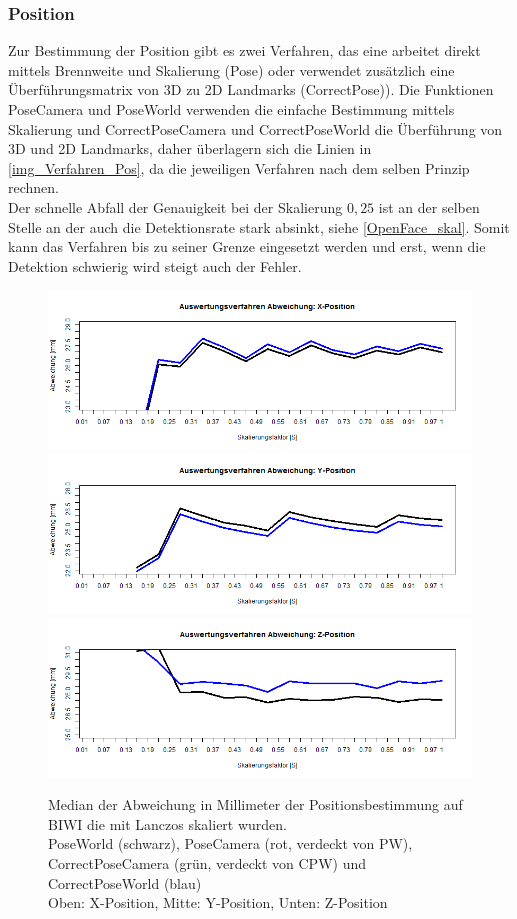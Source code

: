 \subsubsection{Position}
Zur Bestimmung der Position gibt es zwei Verfahren, das eine arbeitet direkt mittels Brennweite und Skalierung (Pose) oder verwendet zusätzlich eine Überführungsmatrix von 3D zu 2D Landmarks (CorrectPose)).
\newpage
Die Funktionen PoseCamera und PoseWorld verwenden die einfache Bestimmung mittels Skalierung und CorrectPoseCamera und CorrectPoseWorld die Überführung von 3D und 2D Landmarks, daher überlagern sich die Linien in \autoref{img_Verfahren_Pos}, da die jeweiligen Verfahren nach dem selben Prinzip rechnen.\\
Der schnelle Abfall der Genauigkeit bei der Skalierung $0,25$ ist an der selben Stelle an der auch die Detektionsrate stark absinkt, siehe \autoref{OpenFace_skal}. Somit kann das Verfahren bis zu seiner Grenze eingesetzt werden und erst, wenn die Detektion schwierig wird steigt auch der Fehler.
\begin{figure}
	\centering
	\includegraphics[width=\linewidth]{img_Skalierung/Verfahren_TX}
	\includegraphics[width=\linewidth]{img_Skalierung/Verfahren_TY}
	\includegraphics[width=\linewidth]{img_Skalierung/Verfahren_TZ}
	\caption{Median der Abweichung in Millimeter der Positionsbestimmung auf BIWI \cite{database_Face_Ori} die mit Lanczos skaliert wurden.\\
	PoseWorld (schwarz), PoseCamera (rot, verdeckt von PW), CorrectPoseCamera (grün, verdeckt von CPW) und CorrectPoseWorld (blau)\\
	Oben: X-Position, Mitte: Y-Position, Unten: Z-Position}
	\label{img_Verfahren_Pos}
\end{figure}
